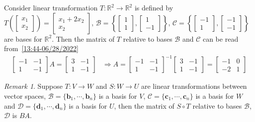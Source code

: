 \documentclass{beamer}
\theoremstyle{definition}
\theoremstyle{remark}
\newtheorem*{remark}{Remark}
\begin{document}
\begin{frame}[t]
\begin{example}
Consider linear transformation $T:\mathbb R^2\to\mathbb R^2$ is defined by $T\left(\begin{bmatrix}
x_1\\x_2
\end{bmatrix}\right)=\begin{bmatrix}
x_1+2x_2\\x_2
\end{bmatrix}$, $\mathcal B=\left\{\begin{bmatrix}
1\\1
\end{bmatrix}, \begin{bmatrix}
1\\-1
\end{bmatrix}\right\}$, $\mathcal C=\left\{\begin{bmatrix}
-1\\1
\end{bmatrix}, \begin{bmatrix}
-1\\-1
\end{bmatrix}\right\}$ are bases for $\mathbb R^2$. Then the matrix of $T$ relative to bases $\mathcal B$ and $\mathcal C$ can be read from~\eqref{13:44-06/28/2022}
\begin{align*}
\begin{bmatrix}
-1&-1\\1&-1
\end{bmatrix}A=\begin{bmatrix}
3&-1\\1&-1
\end{bmatrix}&\Rightarrow A=\begin{bmatrix}
-1&-1\\1&-1
\end{bmatrix}^{-1}\begin{bmatrix}
3&-1\\1&-1
\end{bmatrix}=\begin{bmatrix}
-1&0\\-2&1
\end{bmatrix}
\end{align*}
\end{example}
\pause
\begin{remark}
Suppose $T:V\to W$ and $S:W\to U$ are linear transformations between vector spaces, $\mathcal B=\{\bm b_1,\cdots,\bm b_n\}$ is a basis for $V$, $\mathcal C=\{\bm c_1,\cdots,\bm c_n\}$ is a basis for $W$ and $\mathcal D=\{\bm d_1,\cdots,\bm d_n\}$ is a basis for $U$, then the matrix of $S\circ T$ relative to bases $\mathcal B$, $\mathcal D$ is $BA$.
\end{remark}
\end{frame}
\end{document}
